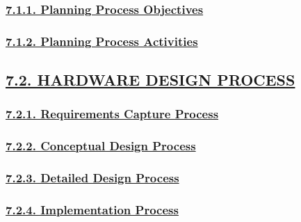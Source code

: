 \documentclass[
]{article}
\begin{document}
\hypertarget{planning-process-objectives}{%
\subsubsection{\texorpdfstring{\protect\hyperlink{planning-process-objectives-1}{7.1.1.
Planning Process
Objectives}}{7.1.1. Planning Process Objectives}}\label{planning-process-objectives}}

\hypertarget{planning-process-activities}{%
\subsubsection{\texorpdfstring{\protect\hyperlink{planning-process-activities-1}{7.1.2.
Planning Process
Activities}}{7.1.2. Planning Process Activities}}\label{planning-process-activities}}

\hypertarget{hardware-design-process}{%
\subsection{\texorpdfstring{\protect\hyperlink{hardware-design-process-1}{7.2.
HARDWARE DESIGN
PROCESS}}{7.2. HARDWARE DESIGN PROCESS}}\label{hardware-design-process}}

\hypertarget{requirements-capture-process}{%
\subsubsection{\texorpdfstring{\protect\hyperlink{requirements-capture-process-1}{7.2.1.
Requirements Capture
Process}}{7.2.1. Requirements Capture Process}}\label{requirements-capture-process}}

\hypertarget{conceptual-design-process}{%
\subsubsection{\texorpdfstring{\protect\hyperlink{conceptual-design-process-1}{7.2.2.
Conceptual Design
Process}}{7.2.2. Conceptual Design Process}}\label{conceptual-design-process}}

\hypertarget{detailed-design-process}{%
\subsubsection{\texorpdfstring{\protect\hyperlink{detailed-design-process-1}{7.2.3.
Detailed Design
Process}}{7.2.3. Detailed Design Process}}\label{detailed-design-process}}

\hypertarget{implementation-process}{%
\subsubsection{\texorpdfstring{\protect\hyperlink{implementation-process-1}{7.2.4.
Implementation
Process}}{7.2.4. Implementation Process}}\label{implementation-process}}
\end{document}
